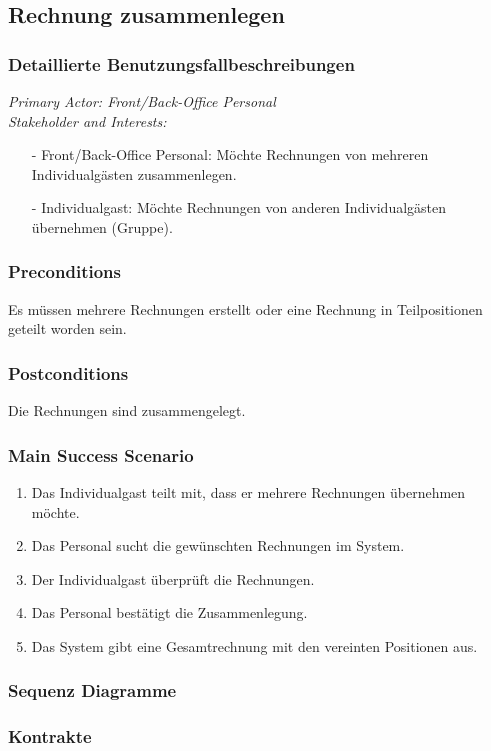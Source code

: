 \documentclass[./detailed_overview_usecases.tex]{subfiles}
\begin{document}
    \subsection{Rechnung zusammenlegen}
    \subsubsection{Detaillierte Benutzungsfallbeschreibungen}
    \textit{Primary Actor: Front/Back-Office Personal}
    \\
    \textit{Stakeholder and Interests:}
    \begin{itemize}
        \item[-] Front/Back-Office Personal: Möchte Rechnungen von mehreren Individualgästen zusammenlegen.
        \item[-] Individualgast: Möchte Rechnungen von anderen Individualgästen übernehmen (Gruppe).
    \end{itemize}

    \subsubsection*{Preconditions}
    Es müssen mehrere Rechnungen erstellt oder eine Rechnung in Teilpositionen geteilt worden sein.

    \subsubsection*{Postconditions}
    Die Rechnungen sind zusammengelegt.

    \subsubsection*{Main Success Scenario}
    \begin{enumerate}
        \item Das Individualgast teilt mit, dass er mehrere Rechnungen übernehmen möchte.
        \item Das Personal sucht die gewünschten Rechnungen im System.
        \item Der Individualgast überprüft die Rechnungen.
        \item Das Personal bestätigt die Zusammenlegung.
        \item Das System gibt eine Gesamtrechnung mit den vereinten Positionen aus.
    \end{enumerate}
    \subsubsection{Sequenz Diagramme}
    \subsubsection{Kontrakte}
\end{document}
